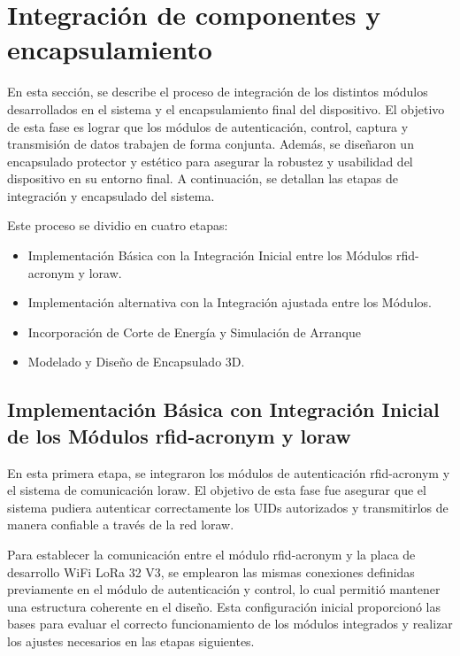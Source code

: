 \section {Integración de componentes y encapsulamiento}

En esta sección, se describe el proceso de integración de los distintos módulos desarrollados en el sistema y el encapsulamiento final del dispositivo. El objetivo de esta fase es lograr que los módulos de autenticación, control, captura y transmisión de datos trabajen de forma conjunta. Además, se diseñaron un encapsulado protector y estético para asegurar la robustez y usabilidad del dispositivo en su entorno final. A continuación, se detallan las etapas de integración y encapsulado del sistema.

Este proceso se dividio en cuatro etapas:

\begin{itemize}
\item { Implementación Básica con la Integración Inicial entre los Módulos \acrshort{rfid-acronym} y \acrshort{loraw}.}
\item { Implementación alternativa con la Integración ajustada entre los Módulos.} 
\item { Incorporación de Corte de Energía y Simulación de Arranque}
\item { Modelado y Diseño de Encapsulado 3D.}
\end{itemize}


\subsection{Implementación Básica con Integración Inicial de los Módulos \acrshort{rfid-acronym} y \acrshort{loraw}}
En esta primera etapa, se integraron los módulos de autenticación \acrshort{rfid-acronym} y el sistema de comunicación \acrshort{loraw}. El objetivo de esta fase fue asegurar que el sistema pudiera autenticar correctamente los UIDs autorizados y transmitirlos de manera confiable a través de la red \acrshort{loraw}.

Para establecer la comunicación entre el módulo \acrshort{rfid-acronym} y la placa de desarrollo WiFi LoRa 32 V3, se emplearon las mismas conexiones definidas previamente en el módulo de autenticación y control, lo cual permitió mantener una estructura coherente en el diseño. Esta configuración inicial proporcionó las bases para evaluar el correcto funcionamiento de los módulos integrados y realizar los ajustes necesarios en las etapas siguientes.


